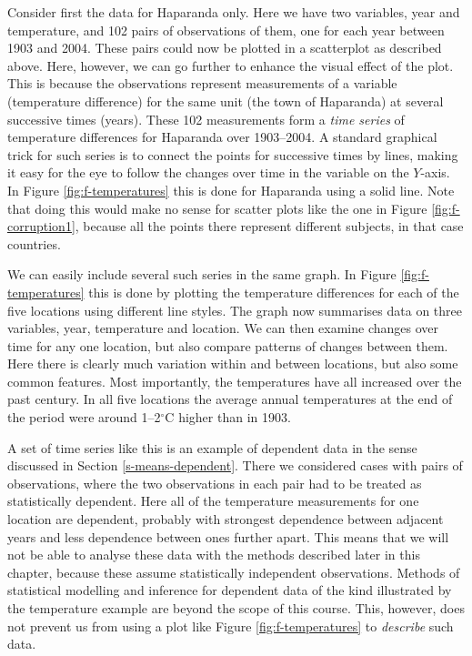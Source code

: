 \documentclass[11pt,a4paper,openany]{book}
\begin{document}
Consider first the data for Haparanda only. Here we have two variables,
year and temperature, and 102 pairs of observations of them, one for
each year between 1903 and 2004. These pairs could now be plotted in a
scatterplot as described above. Here, however, we can go further to
enhance the visual effect of the plot. This is because the observations
represent measurements of a variable (temperature difference) for the
same unit (the town of Haparanda) at several successive times (years).
These 102 measurements form a \emph{time series} of temperature
differences for Haparanda over 1903--2004. A standard graphical trick
for such series is to connect the points for successive times by lines,
making it easy for the eye to follow the changes over time in the
variable on the \(Y\)-axis. In Figure \ref{fig:f-temperatures} this is
done for Haparanda using a solid line. Note that doing this would make
no sense for scatter plots like the one in Figure
\ref{fig:f-corruption1}, because all the points there represent
different subjects, in that case countries.

We can easily include several such series in the same graph. In Figure
\ref{fig:f-temperatures} this is done by plotting the temperature
differences for each of the five locations using different line styles.
The graph now summarises data on three variables, year, temperature and
location. We can then examine changes over time for any one location,
but also compare patterns of changes between them. Here there is clearly
much variation within and between locations, but also some common
features. Most importantly, the temperatures have all increased over the
past century. In all five locations the average annual temperatures at
the end of the period were around 1--2\(^{\circ}\)C higher than in 1903.

A set of time series like this is an example of dependent data in the
sense discussed in Section \ref{s-means-dependent}. There we considered
cases with pairs of observations, where the two observations in each
pair had to be treated as statistically dependent. Here all of the
temperature measurements for one location are dependent, probably with
strongest dependence between adjacent years and less dependence between
ones further apart. This means that we will not be able to analyse these
data with the methods described later in this chapter, because these
assume statistically independent observations. Methods of statistical
modelling and inference for dependent data of the kind illustrated by
the temperature example are beyond the scope of this course. This,
however, does not prevent us from using a plot like Figure
\ref{fig:f-temperatures} to \emph{describe} such data.
\end{document}
